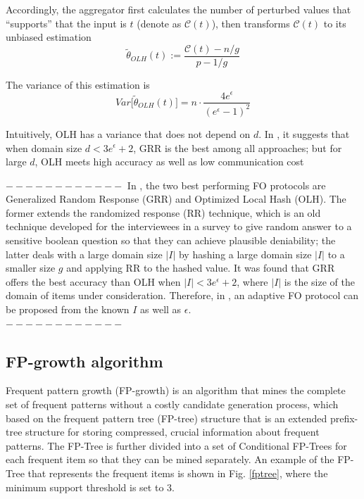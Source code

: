 \documentclass[conference]{IEEEtran}
\begin{document}
Accordingly, the aggregator first calculates the number of perturbed values that ``supports'' that the input is $t$ (denote as $\mathcal{C}(t)$), then transforms $\mathcal{C}(t)$ to its unbiased estimation
\begin{equation}
\tilde{\theta}_{OLH}(t) := \frac{\mathcal{C}(t) - n/g}{p-1/g}
\label{olh aggregate}
\end{equation}

The variance of this estimation is 
\begin{equation}
Var\big[\tilde{\theta}_{OLH}(t)\big] =n \cdot \frac{4e^{\epsilon}}{{(e^{\epsilon}-1)}^2}
\label{olh variance}
\end{equation}

Intuitively, OLH has a variance that does not depend on $d$. In \cite{a8}, it suggests that when domain size $d<3e^{\epsilon} +2$, GRR is the best among all approaches; but for large $d$, OLH meets high accuracy as well as low communication cost


$------------$
{\color{red}In \cite{a8}, the two best performing FO protocols are Generalized Random Response (GRR) and Optimized Local Hash (OLH). The former extends the randomized response (RR) technique\cite{rr}, which is an old technique developed for the interviewees in a survey to give random answer to a sensitive boolean question so that they can achieve plausible deniability; the latter deals with a large domain size $|I|$ by hashing a large domain size $|I|$ to a smaller size $g$ and applying RR to the hashed value. It was found that GRR offers the best accuracy than OLH when $|I| < 3e^{\epsilon} + 2$, where $|I|$ is the size of the domain of items under consideration. Therefore, in  \cite{a2}, an adaptive FO protocol can be proposed from the known $I$ as well as $\epsilon$.\\}
$------------$

\subsection{FP-growth algorithm}
Frequent pattern growth (FP-growth)\cite{fp} is an algorithm that mines the complete set of frequent patterns without a costly candidate generation process, which based on the frequent pattern tree (FP-tree) structure that is an extended prefix-tree structure for storing compressed, crucial information about frequent patterns. The FP-Tree is further divided into a set of Conditional FP-Trees for each frequent item so that they can be mined separately. An example of the FP-Tree that represents the frequent items is shown in Fig. \ref{fptree}, where the minimum support threshold is set to 3.
\end{document}
